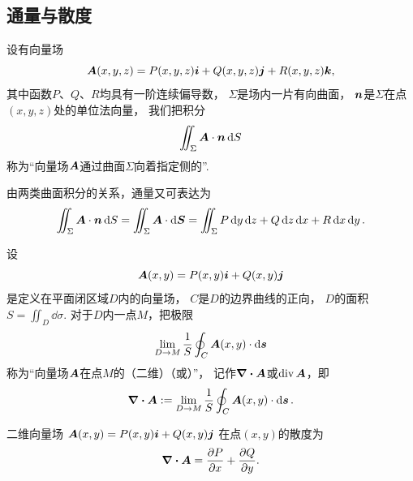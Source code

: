 \subsection{通量与散度}
\begin{definition}
设有向量场\begin{equation*}
	\boldsymbol{A}(x,y,z)=P(x,y,z)\boldsymbol{i}+Q(x,y,z)\boldsymbol{j}+R(x,y,z)\boldsymbol{k},
\end{equation*}
其中函数\(P\)、\(Q\)、\(R\)均具有一阶连续偏导数，
\(\Sigma\)是场内一片有向曲面，
\(\boldsymbol{n}\)是\(\Sigma\)在点\((x,y,z)\)处的单位法向量，
我们把积分\begin{equation*}
	\iint_\Sigma \boldsymbol{A}\cdot\boldsymbol{n} \dd{S}
\end{equation*}称为“向量场\(\boldsymbol{A}\)通过曲面\(\Sigma\)向着指定侧的”.
\end{definition}
由两类曲面积分的关系，通量又可表达为\begin{equation*}
	\iint_\Sigma \boldsymbol{A}\cdot\boldsymbol{n} \dd{S}
	=\iint_\Sigma \boldsymbol{A}\cdot\dd{\boldsymbol{S}}
	=\iint_\Sigma P\dd{y}\dd{z}+Q\dd{z}\dd{x}+R\dd{x}\dd{y}.
\end{equation*}

\begin{definition}[平面上的散度]
\def\defofdiv{\lim_{D \to M} \frac{1}{S} \oint_C \VectorInnerProductDot{\vb{A}(x,y)}{\dd{\vb{s}}}}%
设\begin{equation*}
	\boldsymbol{A}(x,y)=P(x,y)\boldsymbol{i}+Q(x,y)\boldsymbol{j}
\end{equation*}是定义在平面闭区域\(D\)内的向量场，
\(C\)是\(D\)的边界曲线的正向，
\(D\)的面积\(S = \iint_{D} \dd{\sigma}\).
对于\(D\)内一点\(M\)，把极限\begin{equation*}
	\defofdiv
\end{equation*}称为“向量场\(\boldsymbol{A}\)在点\(M\)的（二维）（或）”，
记作\(\div{\boldsymbol{A}}\)或\(\operatorname{div}\boldsymbol{A}\)，即\begin{equation*}
	\div{\vb{A}} \defeq \defofdiv.
\end{equation*}
\end{definition}

\begin{proposition}
二维向量场
\(\boldsymbol{A}(x,y)=P(x,y)\boldsymbol{i}+Q(x,y)\boldsymbol{j}\)
在点\((x,y)\)的散度为\begin{equation*}
	\div{\boldsymbol{A}} = \pdv{P}{x}+\pdv{Q}{y}.
\end{equation*}
\end{proposition}

